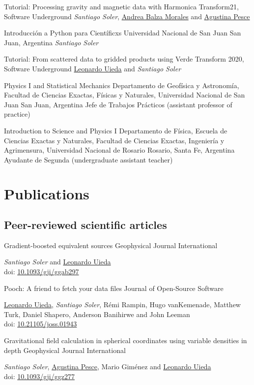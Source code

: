 \documentclass[a4paper,12pt,sans]{moderncv/moderncv}
\newcommand{\me}{\emph{Santiago Soler}}
\newcommand{\agustina}{\href{https://aguspesce.github.io}{Agustina Pesce}}
\newcommand{\andrea}{\href{https://www.andreabalza.com/}{Andrea Balza Morales}}
\newcommand{\leo}{\href{https://www.leouieda.com}{Leonardo Uieda}}
\newcommand{\mario}{Mario Giménez}
\newcommand{\remirampin}{Rémi Rampin}
\newcommand{\hugovankemenade}{Hugo vanKemenade}
\newcommand{\matthewturk}{Matthew Turk}
\newcommand{\danshapero}{Daniel Shapero}
\newcommand{\andersonbanihirwe}{Anderson Banihirwe}
\newcommand{\johnleeman}{John Leeman}
\newcommand{\doi}[1]{
    \href{https://doi.org/#1}{#1}
}
\begin{document}
{Tutorial: Processing gravity and magnetic data with Harmonica}
{Transform21, Software Underground}
{} %
{} %
{\me{}, \andrea{} and \agustina{}} %

{Introducción a Python para Científicxs} %
{Universidad Nacional de San Juan} %
{San Juan, Argentina} %
{} %
{\me{}} %

{Tutorial: From scattered data to gridded products using Verde}
{Transform 2020, Software Underground}
{}
{}
{\leo{} and \me{}}

{Physics I and Statistical Mechanics}
{
    Departamento de Geofísica y Astronomía,
    Facultad de Ciencias Exactas, Físicas y Naturales,
    Universidad Nacional de San Juan
}
{San Juan, Argentina}
{}
{Jefe de Trabajos Prácticos (assistant professor of practice)}

{Introduction to Science and Physics I}
{
    Departamento de Física,
    Escuela de Ciencias Exactas y Naturales,
    Facultad de Ciencias Exactas, Ingeniería y Agrimensura,
    Universidad Nacional de Rosario
}
{Rosario, Santa Fe, Argentina}
{}
{Ayudante de Segunda (undergraduate assistant teacher)}


\section{Publications}

\subsection{Peer-reviewed scientific articles}

{Gradient-boosted equivalent sources}
{Geophysical Journal International}
{}
{}
{
    \me{} and \leo{}
    \\
    doi: \doi{10.1093/gji/ggab297}
}

{Pooch: A friend to fetch your data files}
{Journal of Open-Source Software}
{}
{}
{
    \leo{}, \me{}, \remirampin{}, \hugovankemenade{}, \matthewturk{},
    \danshapero{}, \andersonbanihirwe{} and \johnleeman{}
    \\
    doi: \doi{10.21105/joss.01943}
}

{
    Gravitational field calculation in spherical coordinates using variable
    densities in depth
}
{Geophysical Journal International}
{}
{}
{
    \me{}, \agustina{}, \mario{} and \leo{}
    \\
    doi: \doi{10.1093/gji/ggz277}
}
\end{document}
